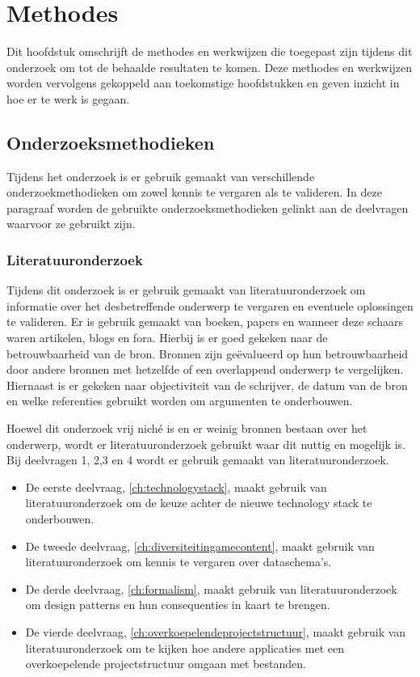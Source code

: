 \chapter{Methodes}
\label{ch:methodes}
Dit hoofdstuk omschrijft de methodes en werkwijzen die toegepast zijn tijdens dit onderzoek om tot de behaalde resultaten te komen. Deze methodes en werkwijzen worden vervolgens gekoppeld aan toekomstige hoofdstukken en geven inzicht in hoe er te werk is gegaan.

\section{Onderzoeksmethodieken}
Tijdens het onderzoek is er gebruik gemaakt van verschillende onderzoekmethodieken om zowel kennis te vergaren als te valideren. In deze paragraaf worden de gebruikte onderzoeksmethodieken gelinkt aan de deelvragen waarvoor ze gebruikt zijn.

\subsection{Literatuuronderzoek}
Tijdens dit onderzoek is er gebruik gemaakt van literatuuronderzoek om informatie over het desbetreffende onderwerp te vergaren en eventuele oplossingen te valideren. Er is gebruik gemaakt van boeken, papers en wanneer deze schaars waren artikelen, blogs en fora. Hierbij is er goed gekeken naar de betrouwbaarheid van de bron. Bronnen zijn geëvalueerd op hun betrouwbaarheid door andere bronnen met hetzelfde of een overlappend onderwerp te vergelijken. Hiernaast is er gekeken naar objectiviteit van de schrijver, de datum van de bron en welke referenties gebruikt worden om argumenten te onderbouwen.

Hoewel dit onderzoek vrij niché is en er weinig bronnen bestaan over het onderwerp, wordt er literatuuronderzoek gebruikt waar dit nuttig en mogelijk is. Bij deelvragen 1, 2,3 en 4 wordt er gebruik gemaakt van literatuuronderzoek.

\begin{itemize}
    \item De eerste deelvraag, \autoref{ch:technologystack}, maakt gebruik van literatuuronderzoek om de keuze achter de nieuwe technology stack te onderbouwen.
    \item De tweede deelvraag, \autoref{ch:diversiteitingamecontent}, maakt gebruik van literatuuronderzoek om kennis te vergaren over dataschema’s.
    \item De derde deelvraag, \autoref{ch:formalism}, maakt gebruik van literatuuronderzoek om design patterns en hun consequenties in kaart te brengen.
    \item De vierde deelvraag, \autoref{ch:overkoepelendeprojectstructuur}, maakt gebruik van literatuuronderzoek om te kijken hoe andere applicaties met een overkoepelende projectstructuur omgaan met bestanden.
\end{itemize}

